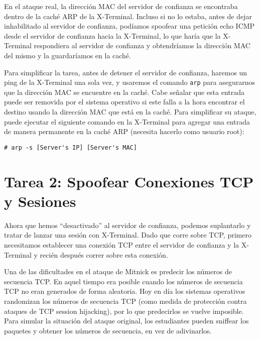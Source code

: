 En el ataque real, la dirección MAC del servidor de confianza se encontraba dentro de la caché ARP de la X-Terminal. Incluso si no lo estaba, antes de dejar inhabilitado al servidor de confianza, podíamos spoofear una petición echo ICMP desde el servidor de confianza hacia la X-Terminal, lo que haría que la X-Terminal respondiera al servidor de confianza y obtendríamos la dirección MAC del mismo y la guardaríamos en la caché.

Para simplificar la tarea, antes de detener el servidor de confianza, haremos un ping de la X-Terminal una sola vez, y usaremos el comando \texttt{arp} para asegurarnos que la dirección MAC se encuentre en la caché. Cabe señalar que esta entrada puede ser removida por el sistema operativo si este falla a la hora encontrar el destino usando la dirección MAC que está en la caché. Para simplificar su ataque, puede ejecutar el siguiente comando en la X-Terminal para agregar una entrada de manera permanente en la caché ARP (necesita hacerlo como usuario root):

\begin{lstlisting}
# arp -s [Server's IP] [Server's MAC]
\end{lstlisting}



\section{Tarea 2: Spoofear Conexiones TCP y Sesiones \rsh}
\label{sec:task2}

Ahora que hemos ``desactivado'' al servidor de confianza, podemos suplantarlo y tratar de lanzar una sesión \rsh con X-Terminal. Dado que \rsh corre sobre TCP, primero necesitamos establecer una conexión TCP entre el servidor de confianza y la X-Terminal y recién después correr \rsh sobre esta conexión.

Una de las dificultades en el ataque de Mitnick es predecir los números de secuencia TCP.
En aquel tiempo era posible cuando los números de secuencia TCP no eran generados de forma aleatoria.
Hoy en día los sistemas operativos randomizan los números de secuencia TCP (como medida de protección contra ataques de TCP session hijacking), por lo que predecirlos se vuelve imposible.
Para simular la situación del ataque original, los estudiantes pueden sniffear los paquetes y obtener los números de secuencia, en vez de adivinarlos.


